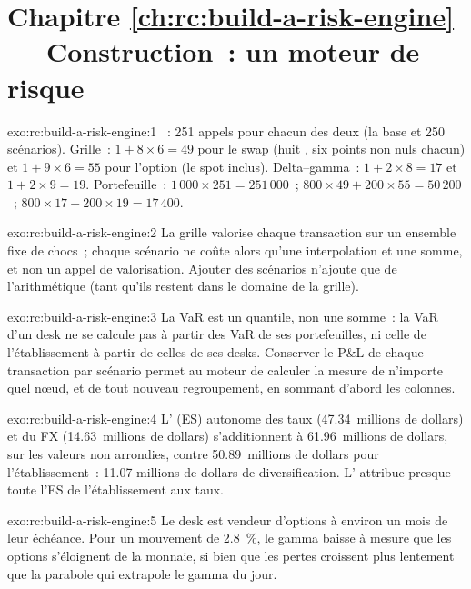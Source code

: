 \section*{Chapitre \ref{ch:rc:build-a-risk-engine} --- Construction~: un moteur de risque}

\begin{solution}{exo:rc:build-a-risk-engine:1}
~: 251 appels pour chacun des deux (la base et 250 scénarios). Grille~: $1+8\times6=49$ pour le swap (huit ,
six points non nuls chacun) et $1+9\times6=55$ pour l'option (le spot inclus). Delta--gamma~: $1+2\times8=17$ et
$1+2\times9=19$. Portefeuille~: $1\,000\times251=251\,000$~; $800\times49+200\times55=50\,200$~; $800\times17+200\times19=17\,400$.
\end{solution}

\begin{solution}{exo:rc:build-a-risk-engine:2}
La grille valorise chaque transaction sur un ensemble fixe de chocs~; chaque scénario ne coûte alors qu'une interpolation et une somme,
et non un appel de valorisation. Ajouter des scénarios n'ajoute que de l'arithmétique (tant qu'ils restent dans le domaine de la grille).
\end{solution}

\begin{solution}{exo:rc:build-a-risk-engine:3}
La VaR est un quantile, non une somme~: la VaR d'un desk ne se calcule pas à partir des VaR de ses portefeuilles, ni celle de l'établissement à partir
de celles de ses desks. Conserver le P\&L de chaque transaction par scénario permet au moteur de calculer la mesure de n'importe quel nœud, et de tout nouveau
regroupement, en sommant d'abord les colonnes.
\end{solution}

\begin{solution}{exo:rc:build-a-risk-engine:4}
L' (ES) autonome des taux (47.34~millions de dollars) et du FX (14.63~millions de dollars) s'additionnent à 61.96~millions de dollars, sur les valeurs non arrondies, contre 50.89~millions de dollars pour l'établissement~: 11.07
millions de dollars de diversification. L' attribue presque toute l'ES de l'établissement aux taux.
\end{solution}

\begin{solution}{exo:rc:build-a-risk-engine:5}
Le desk est vendeur d'options à environ un mois de leur échéance. Pour un mouvement de 2.8~\%, le gamma baisse à mesure que les options s'éloignent
de la monnaie, si bien que les pertes croissent plus lentement que la parabole qui extrapole le gamma du jour.
\end{solution}

